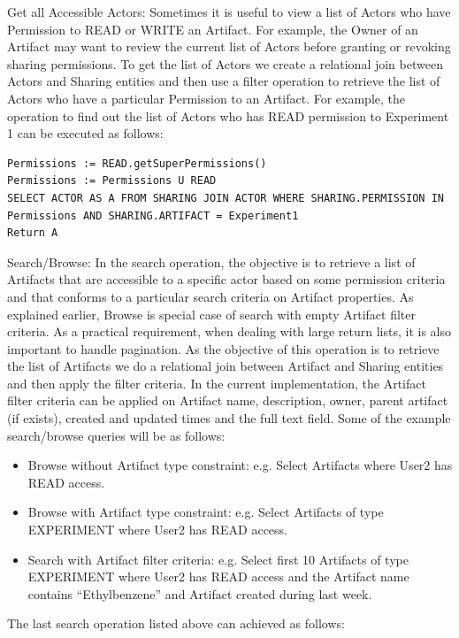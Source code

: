 \documentclass[sigconf]{acmart}
\begin{document}
Get all Accessible Actors: Sometimes it is useful to view a list of Actors who have Permission to READ or WRITE an Artifact. For example, the Owner of an Artifact may want to review the current list of Actors before granting or revoking sharing permissions. To get the list of Actors we create a relational join between Actors and Sharing entities and then use a filter operation to retrieve the list of Actors who have a particular Permission to an Artifact. For example, the operation to find out the list of Actors who has READ permission to Experiment 1 can be executed as follows:

\begin{lstlisting}
Permissions := READ.getSuperPermissions()
Permissions := Permissions U READ
SELECT ACTOR AS A FROM SHARING JOIN ACTOR WHERE SHARING.PERMISSION IN Permissions AND SHARING.ARTIFACT = Experiment1
Return A
\end{lstlisting}

Search/Browse: In the search operation, the objective is to retrieve a list of Artifacts that are accessible to a specific actor based on some permission criteria and that conforms to a particular search criteria on Artifact properties. As explained earlier, Browse is special case of search with empty Artifact filter criteria. As a practical requirement, when dealing with large return lists, it is also important to handle pagination. As the objective of this operation is to retrieve the list of Artifacts we do a relational join between Artifact and Sharing entities and then apply the filter criteria. In the current implementation, the Artifact filter criteria can be applied on Artifact name, description, owner, parent artifact (if exists), created and updated times and the full text field. Some of the example search/browse queries will be as follows:

\begin{itemize}
\item
Browse without Artifact type constraint: e.g. Select Artifacts where User2 has READ access.
\item
Browse with Artifact type constraint: e.g. Select Artifacts of type EXPERIMENT where User2 has READ access.
\item
Search with Artifact filter criteria: e.g. Select first 10 Artifacts of type EXPERIMENT where User2 has READ access and the Artifact name contains ``Ethylbenzene'' and Artifact created during last week.
\end{itemize}

The last search operation listed above can achieved as follows:
\end{document}
